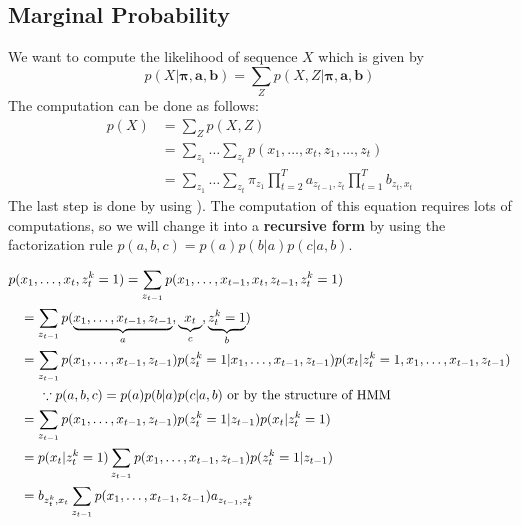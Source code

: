 \subsection{Marginal Probability}
We want to compute the likelihood of sequence $X$ which is given by
$$p(X|\boldsymbol{\pi}\mathbf{, a, b}) = \sum_Z p(X, Z|\boldsymbol{\pi}\mathbf{, a, b})$$
The computation can be done as follows:
\begin{align*}
	p(X) &= \sum_Z p(X,Z)\\
	& = \sum_{z_1}\dots\sum_{z_t}p(x_1,\dots,x_t,z_1,\dots,z_t)\\
	& = \sum_{z_1}\dots\sum_{z_t}\pi_{z_{1}}\prod_{t=2}^{T}a_{z_{t-1},z_t}\prod_{t=1}^{T}b_{z_{t},x_t}
\end{align*}
The last step is done by using ). The computation of this equation requires lots of computations, so we will change it into a \textbf{recursive form} by using the factorization rule $p(a,b,c) = p(a)p(b|a)p(c|a,b)$. 

\begin{align}
	p(&x_1,\dots,x_t,z_t^k=1) = \sum_{z_{t-1}}p(x_1,\dots,x_{t-1}, x_t,z_{t-1},z_t^k=1)\\
	&= \sum_{z_{t-1}} p(\underbrace{x_1,\dots,x_{t-1}, z_{t-1}}_{a}, \underbrace{x_t}_{c}, \underbrace{z_t^k=1}_{b})\\
	& = \sum_{z_{t-1}} p(x_1,\dots,x_{t-1},z_{t-1}) p(z_t^k=1|x_1,\dots,x_{t-1},z_{t-1})p(x_t|z_t^k=1, x_1,\dots,x_{t-1},z_{t-1}) \\
	&\hspace{0.5cm} \because p(a,b,c) = p(a)p(b|a)p(c|a,b) \textrm{ or by the structure of HMM}\nonumber\\ 
	& = \sum_{z_{t-1}} p(x_1,\dots,x_{t-1},z_{t-1}) p(z_t^k=1|z_{t-1}) p(x_t|z_t^k=1)\\
	& = p(x_t|z_t^k=1) \sum_{z_{t-1}} p(x_1,\dots,x_{t-1},z_{t-1}) p(z_t^k=1|z_{t-1}) \\
	& = b_{z^k_t,x_t} \sum_{z_{t-1}} p(x_1,\dots,x_{t-1},z_{t-1}) a_{z_{t-1},z_t^k}
	\label{eq:hmm_eval_fact}
\end{align}

